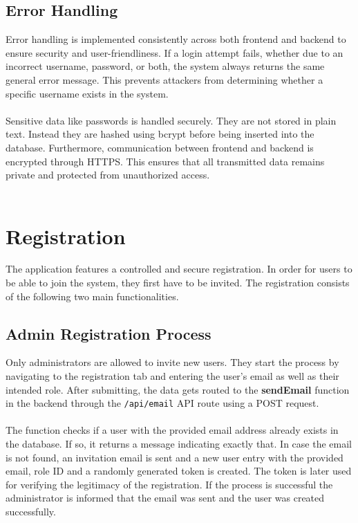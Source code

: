 \documentclass[a4paper,12pt]{report}
\begin{document}
\subsection{Error Handling}
Error handling is implemented consistently across both frontend and backend to ensure security and user-friendliness. If a login attempt fails, whether due to an incorrect username, password, or both, the system always returns the same general error message. This prevents attackers from determining whether a specific username exists in the system.\\\\
Sensitive data like passwords is handled securely. They are not stored in plain text. Instead they are hashed using bcrypt before being inserted into the database. Furthermore, communication between frontend and backend is encrypted through HTTPS. This ensures that all transmitted data remains private and protected from unauthorized access. \\ \\
\section{Registration}
The application features a controlled and secure registration. In order for users to be able to join the system, they first have to be invited. The registration consists of the following two main functionalities. \\
\subsection{Admin Registration Process}
Only administrators are allowed to invite new users. They start the process by navigating to the registration tab and entering the user's email as well as their intended role. After submitting, the data gets routed to the \textbf{sendEmail} function in the backend through the \texttt{/api/email} API route using a POST request. \\\\
The function checks if a user with the provided email address already exists in the database. If so, it returns a message indicating exactly that. In case the email is not found, an invitation email is sent and a new user entry with the provided email, role ID and a randomly generated token is created. The token is later used for verifying the legitimacy of the registration. If the process is successful the administrator is informed that the email was sent and the user was created successfully. \\
\end{document}
